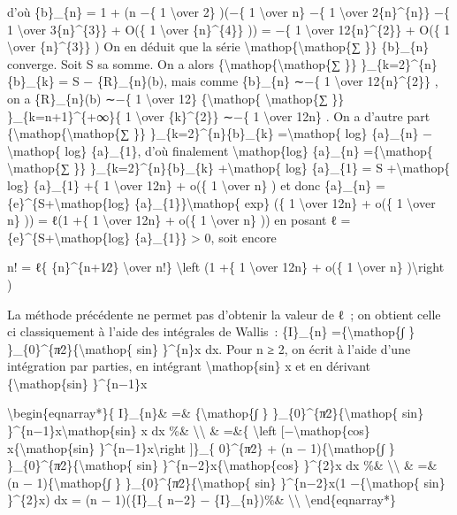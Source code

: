 \documentclass[]{article}
\begin{document}
d'où \{b\}\_\{n\} = 1 + (n −\{ 1 \textbackslash{}over 2\} )(−\{ 1
\textbackslash{}over n\} −\{ 1 \textbackslash{}over 2\{n\}\^{}\{n\}\}
−\{ 1 \textbackslash{}over 3\{n\}\^{}\{3\}\} + O(\{ 1
\textbackslash{}over \{n\}\^{}\{4\}\} )) = −\{ 1 \textbackslash{}over
12\{n\}\^{}\{2\}\} + O(\{ 1 \textbackslash{}over \{n\}\^{}\{3\}\} ) On
en déduit que la série \textbackslash{}mathop\{\textbackslash{}mathop\{∑
\}\} \{b\}\_\{n\} converge. Soit S sa somme. On a alors
\{\textbackslash{}mathop\{\textbackslash{}mathop\{∑ \}\}
\}\_\{k=2\}\^{}\{n\}\{b\}\_\{k\} = S − \{R\}\_\{n\}(b), mais comme
\{b\}\_\{n\} ∼−\{ 1 \textbackslash{}over 12\{n\}\^{}\{2\}\} , on a
\{R\}\_\{n\}(b) ∼−\{ 1 \textbackslash{}over 12\}
\{\textbackslash{}mathop\{ \textbackslash{}mathop\{∑ \}\}
\}\_\{k=n+1\}\^{}\{+∞\}\{ 1 \textbackslash{}over \{k\}\^{}\{2\}\} ∼−\{ 1
\textbackslash{}over 12n\} . On a d'autre part
\{\textbackslash{}mathop\{\textbackslash{}mathop\{∑ \}\}
\}\_\{k=2\}\^{}\{n\}\{b\}\_\{k\} =\textbackslash{}mathop\{ log\}
\{a\}\_\{n\} −\textbackslash{}mathop\{ log\} \{a\}\_\{1\}, d'où
finalement \textbackslash{}mathop\{log\} \{a\}\_\{n\}
=\{\textbackslash{}mathop\{ \textbackslash{}mathop\{∑ \}\}
\}\_\{k=2\}\^{}\{n\}\{b\}\_\{k\} +\textbackslash{}mathop\{ log\}
\{a\}\_\{1\} = S +\textbackslash{}mathop\{ log\} \{a\}\_\{1\} +\{ 1
\textbackslash{}over 12n\} + o(\{ 1 \textbackslash{}over n\} ) et donc
\{a\}\_\{n\} = \{e\}\^{}\{S+\textbackslash{}mathop\{log\}
\{a\}\_\{1\}\}\textbackslash{}mathop\{ exp\} (\{ 1 \textbackslash{}over
12n\} + o(\{ 1 \textbackslash{}over n\} )) = ℓ(1 +\{ 1
\textbackslash{}over 12n\} + o(\{ 1 \textbackslash{}over n\} )) en
posant ℓ = \{e\}\^{}\{S+\textbackslash{}mathop\{log\} \{a\}\_\{1\}\}
\textgreater{} 0, soit encore

n! = ℓ\{ \{n\}\^{}\{n+1∕2\} \textbackslash{}over n!\}
\textbackslash{}left (1 +\{ 1 \textbackslash{}over 12n\} + o(\{ 1
\textbackslash{}over n\} )\textbackslash{}right )

La méthode précédente ne permet pas d'obtenir la valeur de ℓ~; on
obtient celle ci classiquement à l'aide des intégrales de Wallis~:
\{I\}\_\{n\} =\{\textbackslash{}mathop\{∫ \}
\}\_\{0\}\^{}\{π∕2\}\{\textbackslash{}mathop\{ sin\} \}\^{}\{n\}x dx.
Pour n ≥ 2, on écrit à l'aide d'une intégration par parties, en
intégrant \textbackslash{}mathop\{sin\} x et en dérivant
\{\textbackslash{}mathop\{sin\} \}\^{}\{n−1\}x

\textbackslash{}begin\{eqnarray*\}\{ I\}\_\{n\}\& =\&
\{\textbackslash{}mathop\{∫ \}
\}\_\{0\}\^{}\{π∕2\}\{\textbackslash{}mathop\{ sin\}
\}\^{}\{n−1\}x\textbackslash{}mathop\{sin\} x dx \%\&
\textbackslash{}\textbackslash{} \& =\&\{ \textbackslash{}left
{[}−\textbackslash{}mathop\{cos\} x\{\textbackslash{}mathop\{sin\}
\}\^{}\{n−1\}x\textbackslash{}right {]}\}\_\{ 0\}\^{}\{π∕2\} + (n −
1)\{\textbackslash{}mathop\{∫ \}
\}\_\{0\}\^{}\{π∕2\}\{\textbackslash{}mathop\{ sin\}
\}\^{}\{n−2\}x\{\textbackslash{}mathop\{cos\} \}\^{}\{2\}x dx \%\&
\textbackslash{}\textbackslash{} \& =\& (n −
1)\{\textbackslash{}mathop\{∫ \}
\}\_\{0\}\^{}\{π∕2\}\{\textbackslash{}mathop\{ sin\} \}\^{}\{n−2\}x(1
−\{\textbackslash{}mathop\{ sin\} \}\^{}\{2\}x) dx = (n − 1)(\{I\}\_\{
n−2\} − \{I\}\_\{n\})\%\& \textbackslash{}\textbackslash{}
\textbackslash{}end\{eqnarray*\}
\end{document}
